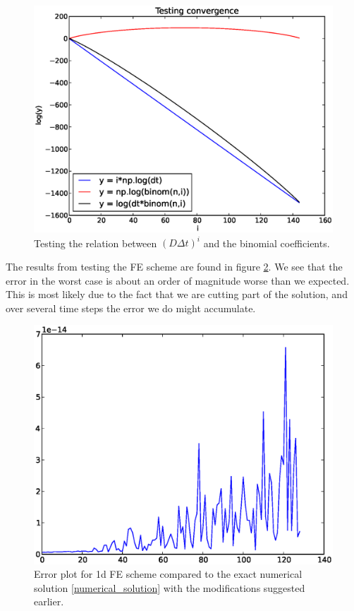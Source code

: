 \begin{figure}[H]
 \centering
 \includegraphics[scale=0.7]{Figures/convergence_exact_numerical_1d_n145}
 \caption{Testing the relation between $\left(D\Delta t\right)^i$ and the binomial coefficients.}
 \label{convergence_exact_numerical_1d_n145}
\end{figure}
The results from testing the FE scheme are found in figure \ref{errorplot_numerical_exact_FE_1D}. We see that the error in the worst case is about an order of magnitude worse than we expected. This is most likely due to the fact that we are cutting part of the solution, and over several time steps the error we do might accumulate.

\begin{figure}[H]
 \centering
 \includegraphics[scale=0.7]{Figures/exact_numerical_1d_n130.eps}
 \caption[Verification for exact numerical solution]{Error plot for 1d FE scheme compared to the exact numerical solution \ref{numerical_solution} with the modifications suggested earlier.}
 \label{errorplot_numerical_exact_FE_1D}
\end{figure}


